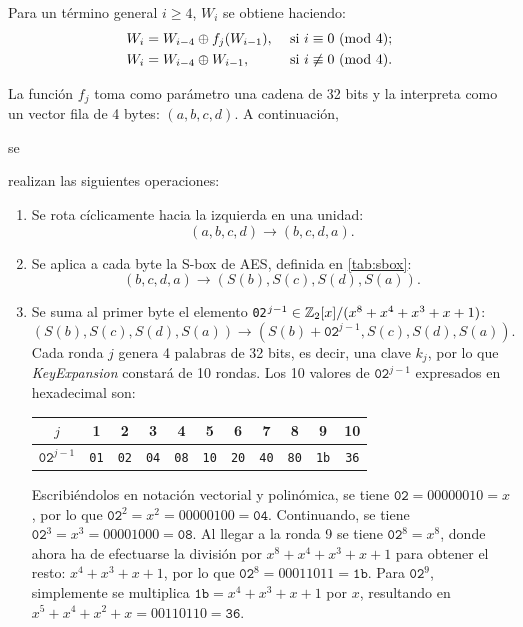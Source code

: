 Para un término general $i \geq4$, $W_i$ se obtiene haciendo:
\begin{align*}
    &&W_i &= W_{i-4}  \oplus f_j(W_{i-1}), &&\text{ si } i \equiv 0 \text{ (mod }4);&&\\
    &&W_i &= W_{i-4}  \oplus W_{i-1}, &&\text{ si } i \not\equiv 0 \text{ (mod }4).&&
\end{align*}

La función $f_j$ toma como parámetro una cadena de 32 bits y la interpreta como un vector fila de 4 bytes: $(a,b,c,d)$. A continuación, \begin{segRevision}se \end{segRevision}realizan las siguientes operaciones:

\begin{enumerate}[itemsep=-5pt]
    \item Se rota cíclicamente hacia la izquierda en una unidad: 
    \[(a,b,c,d) \to (b,c,d, a).\]
    \item Se aplica a cada byte la S-box de AES, definida en \ref{tab:sbox}:
    \[(b,c,d, a) \to (S(b),S(c),S(d),S(a)).\]
    \item Se suma al primer byte el elemento \texttt{02}$^{j-1}\in \mathbb{Z}_2[x]/(x^8 + x^4 + x^3 + x + 1)$:
    \[(S(b),S(c),S(d),S(a)) \to (S(b) + \texttt{02}^{j-1},S(c),S(d),S(a)).\]
Cada ronda $j$ genera 4 palabras de 32 bits, es decir, una clave $k_j$, por lo que \textit{KeyExpansion} constará de 10 rondas. Los 10 valores de $\texttt{02}^{j-1}$ expresados en hexadecimal son:

\begin{table}[h]
    \centering
    \begin{tabular}{|c|cccccccccc|}
        \hline
        $j$ & 1 & 2 & 3 & 4 & 5 & 6 & 7 & 8 & 9 & 10 \\
        \hline
        $\texttt{02}^{j-1}$ & \texttt{01} & \texttt{02} & \texttt{04} & \texttt{08} & \texttt{10} & \texttt{20} & \texttt{40} & \texttt{80} & \texttt{1b} & \texttt{36} \\
        \hline
    \end{tabular}
\end{table}
\vspace{-0.2em}
\begin{Revision}
    Escribiéndolos en notación vectorial y polinómica, se tiene $\texttt{02} = 00000010 = x$, por lo que $\texttt{02}^2 = x^2 = 00000100= \texttt{04}$. Continuando, se tiene $\texttt{02}^3 = x^3 = 00001000= \texttt{08}$. Al llegar a la ronda 9 se tiene $\texttt{02}^8 = x^8$, donde ahora ha de efectuarse la división por $x^8 + x^4 + x^3 + x + 1$ para obtener el resto: $x^4 + x^3 + x + 1$, por lo que $\texttt{02}^8 = 00011011 = \texttt{1b}$. Para $\texttt{02}^9$, simplemente se multiplica $\texttt{1b} = x^4 + x^3 + x + 1$ por $x$, resultando en $x^5 + x^4 + x^2 + x = 00110110 = \texttt{36}$.
\end{Revision}

\end{enumerate}


